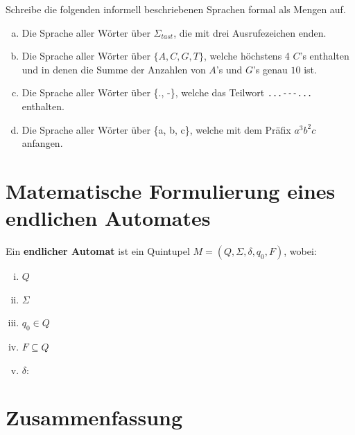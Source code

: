 \documentclass{article}
\begin{document}
\begin{exercise}
Schreibe die folgenden informell beschriebenen Sprachen formal als Mengen auf.


\begin{enumerate}[(a)]
    \item Die Sprache aller Wörter über \(\Sigma_{tast}\), die mit drei Ausrufezeichen enden.\\
    { 
    
    \blank[width=\linewidth]{}}

    \item Die Sprache aller Wörter über \(\{A, C, G, T\}\), welche höchstens 4 \(C\)'s enthalten und in denen die Summe der Anzahlen von \(A\)'s und \(G\)'s genau \(10\) ist. \\
    { 
    
    \blank[width=\linewidth]{}}
    
    \item Die Sprache aller Wörter über \{., -\}, welche das Teilwort \verb|...---...| enthalten. \\
    { 
    
    \blank[width=\linewidth]{}}
    
    \item Die Sprache aller Wörter über \{a, b, c\}, welche mit dem Präfix \(a^3 b^2 c\) anfangen. \\
    { 
    
    \blank[width=\linewidth]{}}
\end{enumerate}
\end{exercise}

\section{Matematische Formulierung eines endlichen Automates}
\begin{definition}[solution=true]
Ein \textbf{endlicher Automat} ist ein Quintupel \(M = (Q, \Sigma, \delta, q_0, F)\), wobei:
{ 
\begin{enumerate}[(i)]
    \item \(Q\) 
    \item \(\Sigma\) 
    \item \(q_0 \in Q\) 
    \item \(F \subseteq Q\) 
    \item \(\delta:\)  
\end{enumerate}
}
\end{definition}


\section{Zusammenfassung}
\end{document}
